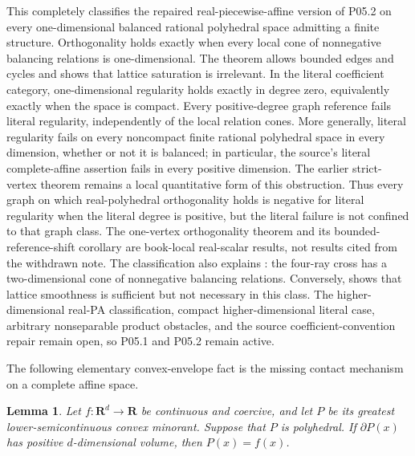 \documentclass[11pt,a4paper]{article}
\newtheorem{lemma}[lemma]{Lemma}
\theoremstyle{definition}
\theoremstyle{remark}
\begin{document}
This completely classifies the repaired real-piecewise-affine version of
P05.2 on every one-dimensional balanced rational polyhedral space admitting
a finite structure.  Orthogonality holds exactly when every local cone of
nonnegative balancing relations is one-dimensional.  The theorem allows
bounded edges and cycles and shows that lattice saturation is irrelevant.
In the literal coefficient category, one-dimensional regularity holds
exactly in degree zero, equivalently exactly when the space is compact.
Every positive-degree graph reference fails literal regularity,
independently of the local relation cones.  More generally, literal
regularity fails on every noncompact finite rational polyhedral space in
every dimension, whether or not it is balanced; in particular, the
source's literal complete-affine assertion fails in every positive
dimension.  The earlier strict-vertex theorem remains a local quantitative
form of this obstruction.  Thus every graph on which real-polyhedral
orthogonality holds is negative for literal regularity when the literal
degree is positive, but the literal failure is not confined to that graph
class.  The
one-vertex orthogonality theorem and its bounded-reference-shift corollary
are book-local real-scalar results, not results cited from the withdrawn
note.  The classification also explains
: the four-ray cross has a
two-dimensional cone of nonnegative balancing relations.  Conversely,
 shows that lattice
smoothness is sufficient but not necessary in this class.  The
higher-dimensional real-PA classification, compact higher-dimensional
literal case, arbitrary nonseparable product obstacles, and the source
coefficient-convention repair remain open, so P05.1 and P05.2 remain active.

The following elementary convex-envelope fact is the missing contact
mechanism on a complete affine space.


\begin{lemma}\label{lem:frontier-polyhedral-affine-contact}
Let \(f:\mathbf R^d\to\mathbf R\) be continuous and coercive, and let
\(P\) be its greatest lower-semicontinuous convex minorant.  Suppose that
\(P\) is polyhedral.  If \(\partial P(x)\) has positive
\(d\)-dimensional volume, then \(P(x)=f(x)\).
\end{lemma}
\end{document}
